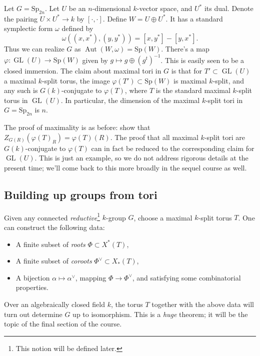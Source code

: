 \documentclass[10pt]{article}
\renewcommand{\phi}{\varphi}
\newcommand{\GL}{\operatorname{GL}}
\renewcommand{\(}{\left(}
\renewcommand{\)}{\right)}
\DeclareMathOperator{\Aut}{Aut}
\newcommand{\Sp}{\mathrm{Sp}}
\numberwithin{thm}{subsection}
\begin{document}
\begin{ex}Let $G=\Sp_{2n}$. Let $U$ be an $n$-dimensional $k$-vector space,
and $U^*$ its dual. Denote the pairing $U\times U^*\to k$ by $[\cdot , \cdot ]$.
Define $W=U\oplus U^*$. It has a standard symplectic form $\omega$ defined by
\[\omega((x,x^*),(y,y^*))=[x,y^*]-[y,x^*].\]
Thus we can realize $G$ as $\Aut(W,\omega)=\Sp(W)$.
There's a map $\phi:\GL(U)\to \Sp(W)$ given by $g\mapsto g\oplus (g^t)^{-1}$.
This is easily seen to be a closed immersion.
The claim about maximal tori in $G$ is that for $T'\subset \GL(U)$
a maximal $k$-split torus, the image $\phi(T')\subset\Sp(W)$ is maximal $k$-split, and any such is 
$G(k)$-conjugate to $\phi(T)$, where $T$ is the standard maximal $k$-split torus in $\GL(U)$. In particular, the dimension of the maximal $k$-split tori in $G=\Sp_{2n}$ is $n$.

The proof of maximality is as before: show that $Z_{G(R)}(\phi(T)_R)=\phi(T)(R)$. The proof that all maximal $k$-split tori are 
$G(k)$-conjugate to $\phi(T)$ can in fact be reduced to the corresponding claim for $\GL(U)$.
This is just an example, so we do not address rigorous details at the present time; we'll come back to this
more broadly in the sequel course as well. 
\end{ex}
\subsection{Building up groups from tori}
Given any connected \textit{reductive}\footnote{This notion will be defined later.}
$k$-group $G$, choose a maximal $k$-split torus $T$. One can construct the following data:
\begin{itemize}
\item A finite subset of \textit{roots} $\Phi\subset X^*(T)$,
\item A finite subset of \textit{coroots} $\Phi^\vee\subset X_*(T)$,
\item A bijection $\alpha\mapsto \alpha^\vee$, mapping $\Phi\to\Phi^\vee$,
and satisfying some combinatorial properties.
\end{itemize}
\begin{thm}Over an algebraically closed field $k$, the torus $T$ together with the above
data will turn out determine $G$ up to isomorphism.  This is a {\em huge} theorem;
it will be the topic of the final section of the course. 
\end{thm}
\end{document}
